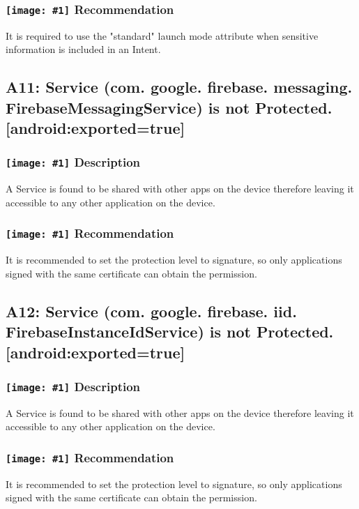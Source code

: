 \documentclass[12p]{article}
\newcommand{\icon}[1]{\texttt{[image: \#1]}}
\begin{document}
\subsubsection*{\protect\icon{/home/miki/Documents/GITHUB/AndroidPermissions/python/vulns/report_icons/basic_todo.png} Recommendation}
It is required to use the "standard" launch mode attribute when sensitive information is included in an Intent.
\subsection{A11: Service (com. google. firebase. messaging. FirebaseMessagingService) is not Protected. [android:exported=true]}
\subsubsection*{\protect\icon{/home/miki/Documents/GITHUB/AndroidPermissions/python/vulns/report_icons/basic_sheet.png} Description}
A Service is found to be shared with other apps on the device therefore leaving it accessible to any other application on the device.
\subsubsection*{\protect\icon{/home/miki/Documents/GITHUB/AndroidPermissions/python/vulns/report_icons/basic_todo.png} Recommendation}
It is recommended to set the protection level to signature, so only applications signed with the same certificate can obtain the permission.
\subsection{A12: Service (com. google. firebase. iid. FirebaseInstanceIdService) is not Protected. [android:exported=true]}
\subsubsection*{\protect\icon{/home/miki/Documents/GITHUB/AndroidPermissions/python/vulns/report_icons/basic_sheet.png} Description}
A Service is found to be shared with other apps on the device therefore leaving it accessible to any other application on the device.
\subsubsection*{\protect\icon{/home/miki/Documents/GITHUB/AndroidPermissions/python/vulns/report_icons/basic_todo.png} Recommendation}
It is recommended to set the protection level to signature, so only applications signed with the same certificate can obtain the permission.
\end{document}
